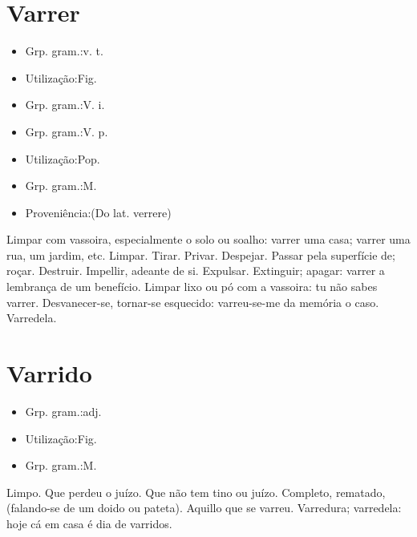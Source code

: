 \documentclass{article}
\begin{document}
\section{Varrer}
\begin{itemize}
\item {Grp. gram.:v. t.}
\end{itemize}
\begin{itemize}
\item {Utilização:Fig.}
\end{itemize}
\begin{itemize}
\item {Grp. gram.:V. i.}
\end{itemize}
\begin{itemize}
\item {Grp. gram.:V. p.}
\end{itemize}
\begin{itemize}
\item {Utilização:Pop.}
\end{itemize}
\begin{itemize}
\item {Grp. gram.:M.}
\end{itemize}
\begin{itemize}
\item {Proveniência:(Do lat. \textunderscore verrere\textunderscore )}
\end{itemize}
Limpar com vassoira, especialmente o solo ou soalho: \textunderscore varrer uma casa\textunderscore ; \textunderscore varrer uma rua, um jardim\textunderscore , etc.
Limpar.
Tirar.
Privar.
Despejar.
Passar pela superfície de; roçar.
Destruir.
Impellir, adeante de si.
Expulsar.
Extinguir; apagar: \textunderscore varrer a lembrança de um benefício\textunderscore .
Limpar lixo ou pó com a vassoira: \textunderscore tu não sabes varrer\textunderscore .
Desvanecer-se, tornar-se esquecido: \textunderscore varreu-se-me da memória o caso\textunderscore .
Varredela.
\section{Varrido}
\begin{itemize}
\item {Grp. gram.:adj.}
\end{itemize}
\begin{itemize}
\item {Utilização:Fig.}
\end{itemize}
\begin{itemize}
\item {Grp. gram.:M.}
\end{itemize}
Limpo.
Que perdeu o juízo.
Que não tem tino ou juízo.
Completo, rematado, (falando-se de um doido ou pateta).
Aquillo que se varreu.
Varredura; varredela: \textunderscore hoje cá em casa é dia de varridos\textunderscore .
\end{document}
